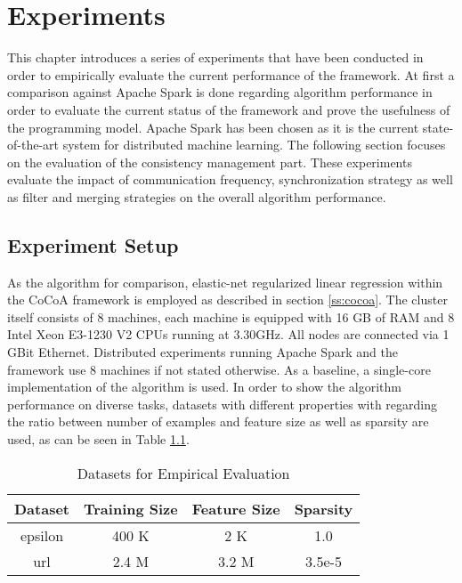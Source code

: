 
\chapter{Experiments}
\label{c:experiments}
This chapter introduces a series of experiments that have been conducted in order to empirically evaluate the current performance of the framework.
At first a comparison against Apache Spark is done regarding algorithm performance in order to evaluate the current status of the framework and prove the usefulness of the programming model.
Apache Spark has been chosen as it is the current state-of-the-art system for distributed machine learning.
The following section focuses on the evaluation of the consistency management part.
These experiments evaluate the impact of communication frequency, synchronization strategy as well as filter and merging strategies on the overall algorithm performance. 

\section{Experiment Setup}
As the algorithm for comparison, elastic-net regularized linear regression within the CoCoA framework is employed as described in section \ref{ss:cocoa}.
The cluster itself consists of 8 machines, each machine is equipped with 16 GB of RAM and 8 Intel Xeon E3-1230 V2 CPUs running at 3.30GHz.
All nodes are connected via 1 GBit Ethernet.
Distributed experiments running Apache Spark and the framework use 8 machines if not stated otherwise.
As a baseline, a single-core implementation of the algorithm is used.
In order to show the algorithm performance on diverse tasks, datasets with different properties with regarding the ratio between number of examples and feature size as well as sparsity are used, as can be seen in Table \ref{tab:datasets}.

\begin{table}[h]
\begin{center}
\begin{tabular}{ | c | c | c | c |}
\hline
\textbf{Dataset} & \textbf{Training Size} & \textbf{Feature Size} & \textbf{Sparsity} \\ \hline
epsilon & 400 K & 2 K & 1.0 \\ \hline
url & 2.4 M & 3.2 M & 3.5e-5 \\
\hline
\end{tabular}
\end{center}
\caption{Datasets for Empirical Evaluation}
\label{tab:datasets}
\end{table}

